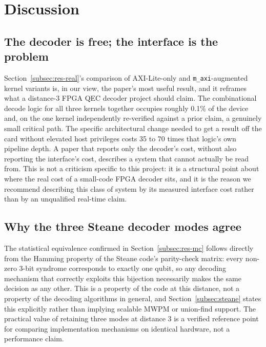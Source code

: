 \section{Discussion}\label{sec:discussion}

\subsection{The decoder is free; the interface is the problem}\label{subsec:disc-thesis}

Section~\ref{subsec:res-real}'s comparison of AXI-Lite-only and \texttt{m\_axi}-augmented kernel variants is, in our view, the paper's most useful result, and it reframes what a distance-3 FPGA QEC decoder project should claim. The combinational decode logic for all three kernels together occupies roughly 0.1\% of the device and, on the one kernel independently re-verified against a prior claim, a genuinely small critical path. The specific architectural change needed to get a result off the card without elevated host privileges costs 35 to 70 times that logic's own pipeline depth. A paper that reports only the decoder's cost, without also reporting the interface's cost, describes a system that cannot actually be read from. This is not a criticism specific to this project: it is a structural point about where the real cost of a small-code FPGA decoder sits, and it is the reason we recommend describing this class of system by its measured interface cost rather than by an unqualified real-time claim.

\subsection{Why the three Steane decoder modes agree}\label{subsec:disc-decoders}

The statistical equivalence confirmed in Section~\ref{subsec:res-mc} follows directly from the Hamming property of the Steane code's parity-check matrix: every non-zero 3-bit syndrome corresponds to exactly one qubit, so any decoding mechanism that correctly exploits this bijection necessarily makes the same decision as any other. This is a property of the code at this distance, not a property of the decoding algorithms in general, and Section~\ref{subsec:steane} states this explicitly rather than implying scalable MWPM or union-find support. The practical value of retaining three modes at distance 3 is a verified reference point for comparing implementation mechanisms on identical hardware, not a performance claim.

